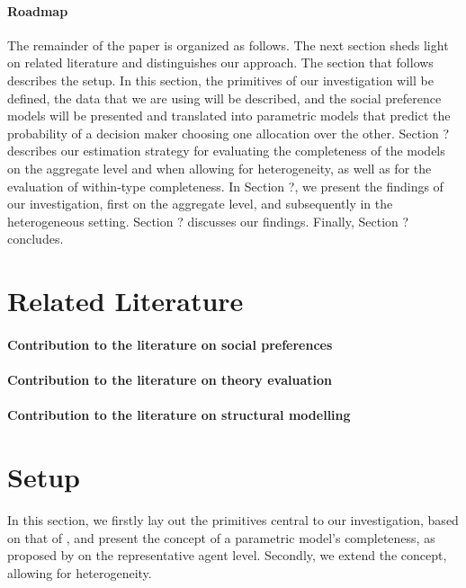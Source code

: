 \documentclass[letterpaper,11pt,leqno]{article}
\begin{document}
\paragraph{Roadmap} The remainder of the paper is organized as follows. The next section sheds light on related literature and distinguishes our approach. The section that follows describes the setup. In this section, the primitives of our investigation will be defined, the data that we are using will be described, and the social preference models will be presented and translated into parametric models that predict the probability of a decision maker choosing one allocation over the other. Section ? describes our estimation strategy for evaluating the completeness of the models on the aggregate level and when allowing for heterogeneity, as well as for the evaluation of within-type completeness. In Section ?, we present the findings of our investigation, first on the aggregate level, and subsequently in the heterogeneous setting. Section ? discusses our findings. Finally, Section ? concludes.

\section{Related Literature}

\paragraph{Contribution to the literature on social preferences}

\paragraph{Contribution to the literature on theory evaluation}

\paragraph{Contribution to the literature on structural modelling}

\section{Setup}
In this section, we firstly lay out the primitives central to our investigation, based on that of \citet{Fudenberg2021a}, and present the concept of a parametric model's completeness, as proposed by \citet{Fudenberg2022} on the representative agent level. Secondly, we extend the concept, allowing for heterogeneity.
\end{document}
